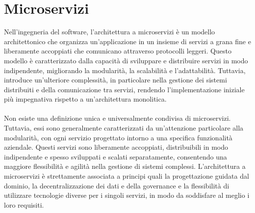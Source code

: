 \chapter{Microservizi}

Nell'ingegneria del software, l'architettura a microservizi è un modello architettonico che organizza un'applicazione in un insieme di servizi a grana fine e liberamente accoppiati che comunicano attraverso protocolli leggeri. Questo modello è caratterizzato dalla capacità di sviluppare e distribuire servizi in modo indipendente, migliorando la modularità, la scalabilità e l'adattabilità. Tuttavia, introduce un'ulteriore complessità, in particolare nella gestione dei sistemi distribuiti e della comunicazione tra servizi, rendendo l'implementazione iniziale più impegnativa rispetto a un'architettura monolitica. \\ \\
Non esiste una definizione unica e universalmente condivisa di microservizi. Tuttavia, essi sono generalmente caratterizzati da un'attenzione particolare alla modularità, con ogni servizio progettato intorno a una specifica funzionalità aziendale. Questi servizi sono liberamente accoppiati, distribuibili in modo indipendente e spesso sviluppati e scalati separatamente, consentendo una maggiore flessibilità e agilità nella gestione di sistemi complessi. L'architettura a microservizi è strettamente associata a principi quali la progettazione guidata dal dominio, la decentralizzazione dei dati e della governance e la flessibilità di utilizzare tecnologie diverse per i singoli servizi, in modo da soddisfare al meglio i loro requisiti. 

\newpage
